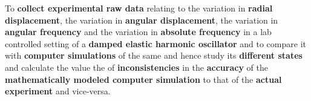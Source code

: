 {To \textbf{collect experimental raw data} relating to the variation in \textbf{radial displacement}, the variation in \textbf{angular displacement}, the variation in \textbf{angular frequency} and the variation in \textbf{absolute frequency} in a lab controlled setting of a \textbf{damped elastic harmonic oscillator} and to compare it with \textbf{computer simulations} of the same and hence study its \textbf{different states} and calculate the value the of \textbf{inconsistencies} in the \textbf{accuracy} of the \textbf{mathematically modeled computer simulation} to that of the \textbf{actual experiment} and vice-versa.}
